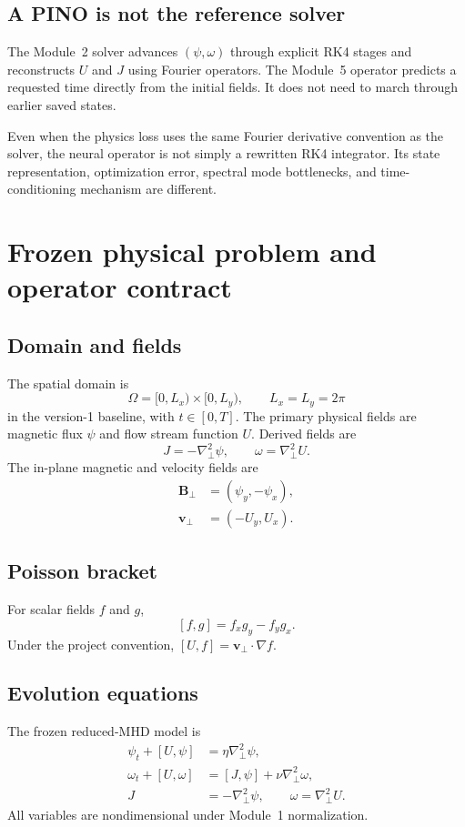 \documentclass[11pt]{article}
\newcommand{\vect}[1]{\bm{#1}}
\newcommand{\bracket}[2]{\left[#1,#2\right]}
\newcommand{\Lap}{\nabla_\perp^2}
\begin{document}
\subsection{A PINO is not the reference solver}
The Module~2 solver advances $(\psi,\omega)$ through explicit RK4 stages and reconstructs $U$ and $J$ using Fourier operators. The Module~5 operator predicts a requested time directly from the initial fields. It does not need to march through earlier saved states.

Even when the physics loss uses the same Fourier derivative convention as the solver, the neural operator is not simply a rewritten RK4 integrator. Its state representation, optimization error, spectral mode bottlenecks, and time-conditioning mechanism are different.

\section{Frozen physical problem and operator contract}
\label{sec:physics}

\subsection{Domain and fields}
The spatial domain is
\begin{equation}
\Omega=[0,L_x)\times[0,L_y),\qquad L_x=L_y=2\pi
\end{equation}
in the version-1 baseline, with $t\in[0,T]$. The primary physical fields are magnetic flux $\psi$ and flow stream function $U$. Derived fields are
\begin{equation}
J=-\Lap\psi,
\qquad
\omega=\Lap U.
\label{eq:derived}
\end{equation}
The in-plane magnetic and velocity fields are
\begin{align}
\vect B_\perp&=(\psi_y,-\psi_x),\\
\vect v_\perp&=(-U_y,U_x).
\end{align}

\subsection{Poisson bracket}
For scalar fields $f$ and $g$,
\begin{equation}
\bracket{f}{g}=f_xg_y-f_yg_x.
\label{eq:bracket}
\end{equation}
Under the project convention, $[U,f]=\vect v_\perp\cdot\nabla f$.

\subsection{Evolution equations}
The frozen reduced-MHD model is
\begin{align}
\psi_t+\bracket{U}{\psi}&=\eta\Lap\psi,
\label{eq:flux}\qquad\\
\omega_t+\bracket{U}{\omega}&=\bracket{J}{\psi}+\nu\Lap\omega,
\label{eq:vort}\qquad\\
J&=-\Lap\psi,\qquad \omega=\Lap U.
\end{align}
All variables are nondimensional under Module~1 normalization.
\end{document}
